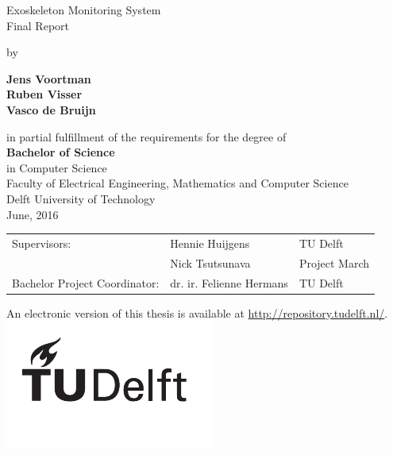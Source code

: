 \begin{titlepage}
\begin{center}

{\makeatletter
\Huge Exoskeleton Monitoring System
\makeatother}\\[0.2cm]

{\makeatletter
\LARGE Final Report
\makeatother}

\bigskip
\bigskip

by

\bigskip
\bigskip

{\makeatletter \bfseries
Jens Voortman\\
Ruben Visser\\
Vasco de Bruijn
\makeatother}

\vfill
in partial fulfillment of the requirements for the degree of\\
\bigskip
{\bfseries \large Bachelor of Science}\\
{\large in Computer Science}\\
\bigskip
Faculty of Electrical Engineering, Mathematics and Computer Science\\
Delft University of Technology\\
{\large June, 2016}\\



\vfill

\begin{tabular}{l l l}
    Supervisors: & Hennie Huijgens & TU Delft \\
    & Nick Tsutsunava & Project March \\
    Bachelor Project Coordinator: & dr. ir. Felienne Hermans & TU Delft\\
 \end{tabular}

\bigskip
\bigskip

\bigskip
\bigskip

An electronic version of this thesis is available at \url{http://repository.tudelft.nl/}.\\[0.5cm]
\includegraphics{logo/logo_black}
\end{center}
\end{titlepage}